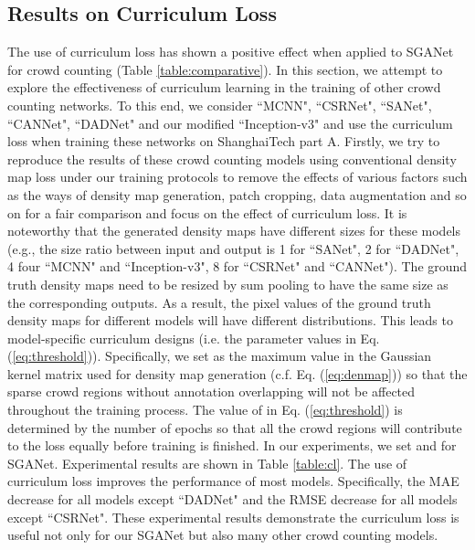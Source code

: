 \documentclass[journal,comsoc]{IEEEtran}
\begin{document}
\subsection{Results on Curriculum Loss}\label{sec:result_cl}
The use of curriculum loss has shown a positive effect when applied to SGANet for crowd counting (Table \ref{table:comparative}). In this section, we attempt to explore the effectiveness of curriculum learning in the training of other crowd counting networks. To this end, we consider ``MCNN", ``CSRNet", ``SANet", ``CANNet", ``DADNet" and our modified ``Inception-v3" and use the curriculum loss when training these networks on ShanghaiTech part A. Firstly, we try to reproduce the results of these crowd counting models using conventional density map loss under our training protocols to remove the effects of various factors such as the ways of density map generation, patch cropping, data augmentation and so on for a fair comparison and focus on the effect of curriculum loss. It is noteworthy that the generated density maps have different sizes for these models (e.g., the size ratio between input and output is 1 for ``SANet", 2 for ``DADNet", 4 four ``MCNN" and ``Inception-v3", 8 for ``CSRNet" and ``CANNet"). The ground truth density maps need to be resized by sum pooling to have the same size as the corresponding outputs. As a result, the pixel values of the ground truth density maps for different models will have different distributions. This leads to model-specific curriculum designs (i.e. the parameter values in Eq.(\ref{eq:threshold})). 
Specifically, we set  as the maximum value in the Gaussian kernel matrix  used for density map generation (c.f. Eq. (\ref{eq:denmap})) so that the sparse crowd regions without annotation overlapping will not be affected throughout the training process. The value of  in Eq. (\ref{eq:threshold}) is determined by the number of epochs so that all the crowd regions will contribute to the loss equally before training is finished. 
In our experiments, we set  and  for SGANet. Experimental results are shown in Table \ref{table:cl}. The use of curriculum loss improves the performance of most models. Specifically, the MAE decrease for all models except ``DADNet" and the RMSE decrease for all models except ``CSRNet". These experimental results demonstrate the curriculum loss is useful not only for our SGANet but also many other crowd counting models.
\end{document}
